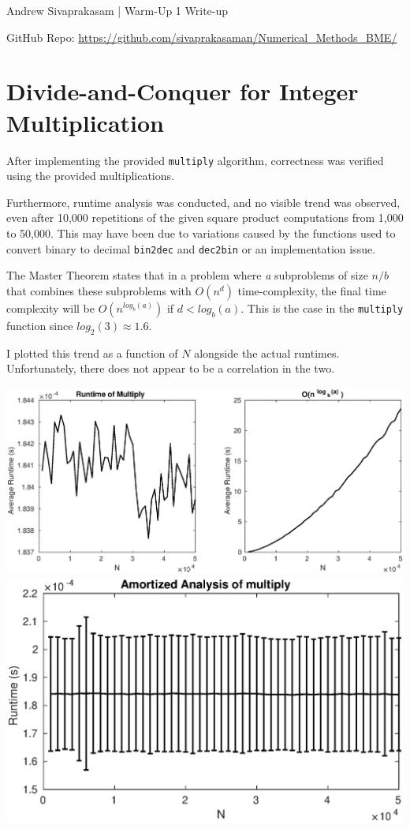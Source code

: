 \documentclass[12pt]{extarticle}
\begin{document}
{\Large Andrew Sivaprakasam | Warm-Up 1 Write-up}

GitHub Repo: \url{https://github.com/sivaprakasaman/Numerical_Methods_BME/} 

\section{Divide-and-Conquer for Integer Multiplication}
After implementing the provided \verb|multiply| algorithm, correctness was verified using the provided multiplications. 
\vspace{4pt}

Furthermore, runtime analysis was conducted, and no visible trend was observed, even after 10,000 repetitions of the given square product computations from 1,000 to 50,000. This may have been due to variations caused by the functions used to convert binary to decimal \verb|bin2dec| and \verb|dec2bin| or an implementation issue. 

\vspace{4pt}
The Master Theorem states that in a problem where \textit{a} subproblems of size $n/b$ that combines these subproblems with $O(n^d)$ time-complexity, the final time complexity will be $O(n^{log_b(a)})$ if $d < log_b(a)$. This is the case in the \verb|multiply| function since $log_2(3) \approx 1.6$.

\vspace{4pt}
I plotted this trend as a function of $N$ alongside the actual runtimes. Unfortunately, there does not appear to be a correlation in the two.
\vspace{12pt}

\begin{center}
\includegraphics[width = 1.0\textwidth]{part1}\\
\vspace{12pt}
\includegraphics[width = .75\textwidth]{part1b}
\end{center}
\end{document}

